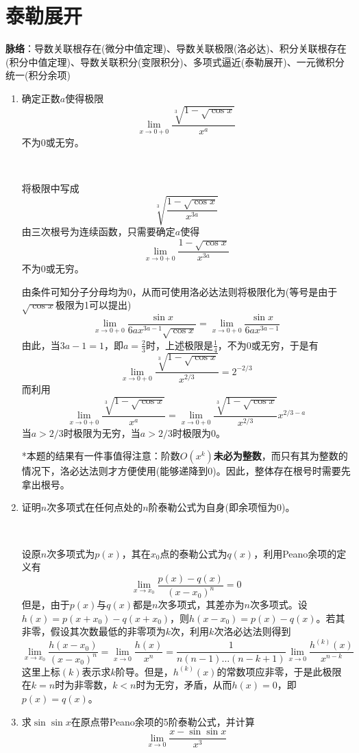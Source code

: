 \documentclass[a4paper,UTF8,fontset=windows]{ctexart}
\begin{document}
\section{泰勒展开}
\textbf{脉络}：导数关联根存在(微分中值定理)、导数关联极限(洛必达)、积分关联根存在(积分中值定理)、导数关联积分(变限积分)、多项式逼近(泰勒展开)、一元微积分统一(积分余项)

\begin{enumerate}
    \item 确定正数$a$使得极限
    $$\lim_{x\to0+0}\frac{\sqrt[3]{1-\sqrt{\cos x}}}{x^a}$$
    不为0或无穷。

    \

    将极限中写成
    $$\sqrt[3]{\frac{{1-\sqrt{\cos x}}}{x^{3a}}}$$
    由三次根号为连续函数，只需要确定$a$使得
    $$\lim_{x\to0+0}\frac{{1-\sqrt{\cos x}}}{x^{3a}}$$
    不为0或无穷。

    由条件可知分子分母均为0，从而可使用洛必达法则将极限化为(等号是由于$\sqrt{\cos x}$极限为1可以提出)
    $$\lim_{x\to0+0}\frac{\sin x}{6a x^{3a-1}\sqrt{\cos x}}=\lim_{x\to0+0}\frac{\sin x}{6a x^{3a-1}}$$
    由此，当$3a-1=1$，即$a=\frac{2}{3}$时，上述极限是$\frac{1}{4}$，不为0或无穷，于是有
    $$\lim_{x\to0+0}\frac{\sqrt[3]{1-\sqrt{\cos x}}}{x^{2/3}}=2^{-2/3}$$
    而利用
    $$\lim_{x\to0+0}\frac{\sqrt[3]{1-\sqrt{\cos x}}}{x^a}=\lim_{x\to0+0}\frac{\sqrt[3]{1-\sqrt{\cos x}}}{x^{2/3}}x^{2/3-a}$$
    当$a>2/3$时极限为无穷，当$a>2/3$时极限为0。

    *本题的结果有一件事值得注意：阶数$O(x^k)$\textbf{未必为整数}，而只有其为整数的情况下，洛必达法则才方便使用(能够递降到0)。因此，整体存在根号时需要先拿出根号。

    \item 证明$n$次多项式在任何点处的$n$阶泰勒公式为自身(即余项恒为0)。
    
    \

    设原$n$次多项式为$p(x)$，其在$x_0$点的泰勒公式为$q(x)$，利用Peano余项的定义有
    $$\lim_{x\to x_0}\frac{p(x)-q(x)}{(x-x_0)^n}=0$$
    但是，由于$p(x)$与$q(x)$都是$n$次多项式，其差亦为$n$次多项式。设$h(x)=p(x+x_0)-q(x+x_0)$，则$h(x-x_0)=p(x)-q(x)$。若其非零，假设其次数最低的非零项为$k$次，利用$k$次洛必达法则得到
    $$\lim_{x\to x_0}\frac{h(x-x_0)}{(x-x_0)^n}=\lim_{x\to 0}\frac{h(x)}{x^n}=\frac{1}{n(n-1)\dots(n-k+1)}\lim_{x\to 0}\frac{h^{(k)}(x)}{x^{n-k}}$$
    这里上标$(k)$表示求$k$阶导。但是，$h^{(k)}(x)$的常数项应非零，于是此极限在$k=n$时为非零数，$k<n$时为无穷，矛盾，从而$h(x)=0$，即$p(x)=q(x)$。
    
    \item 求$\sin\sin x$在原点带Peano余项的5阶泰勒公式，并计算
    $$\lim_{x\to0}\frac{x-\sin\sin x}{x^3}$$


\end{enumerate}
\end{document}
